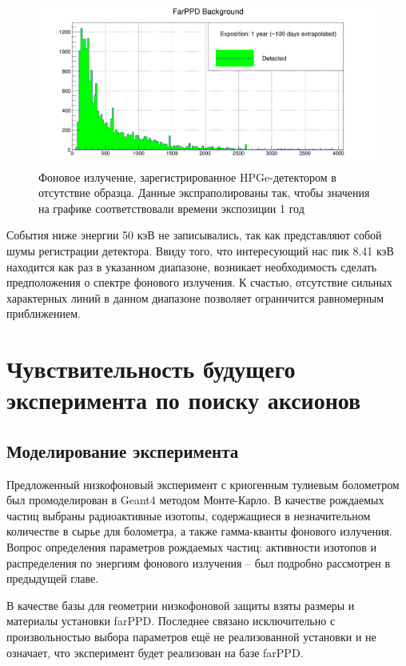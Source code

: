 \documentclass[a4paper,article,14pt]{extarticle}
\begin{document}
    \begin{figure}[h]
    \centering
    \includegraphics[width = 0.85 \textwidth]{images/FarPPD_background.png}
    \caption{Фоновое излучение, зарегистрированное HPGe-детектором в отсутствие образца. Данные экспраполированы так, чтобы значения на графике соответствовали времени экспозиции 1 год}
    \label{Ey}
\end{figure}
    
    События ниже энергии 50 кэВ не записывались, так как представляют собой шумы регистрации детектора. Ввиду того, что интересующий нас пик 8.41 кэВ находится как раз в указанном диапазоне, возникает необходимость сделать предположения о спектре фонового излучения. К счастью, отсутствие сильных характерных линий в данном диапазоне позволяет ограничится равномерным приближением.
    
\section{Чувствительность будущего эксперимента по поиску аксионов}

\subsection{Моделирование эксперимента}

Предложенный низкофоновый эксперимент с криогенным тулиевым болометром был промоделирован в Geant4 методом Монте-Карло. В качестве рождаемых частиц выбраны радиоактивные изотопы, содержащиеся в незначительном количестве в сырье для болометра, а также гамма-кванты фонового излучения. Вопрос определения параметров рождаемых частиц: активности изотопов и распределения по энергиям фонового излучения -- был подробно рассмотрен в предыдущей главе.

В качестве базы для геометрии низкофоновой защиты взяты размеры и материалы установки farPPD. Последнее связано исключительно с произвольностью выбора параметров ещё не реализованной установки и не означает, что эксперимент будет реализован на базе farPPD. 
\end{document}
